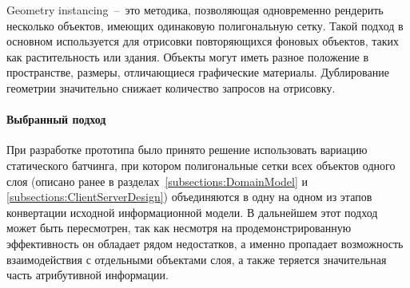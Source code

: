 \begin{enumerate}
{        Geometry instancing~--~это методика, позволяющая
        одновременно рендерить нес\-колько объектов, имеющих
        одинаковую полигональную сетку.
        Такой подход в основном используется для отрисовки
        повторяющихся фоновых объектов, таких как растительность или здания.
        Объекты могут иметь разное положение в пространстве,
        размеры, отличающиеся графические материалы.
        Дублирование геометрии значительно снижает
        количество запросов на отрисовку.
    }
\end{enumerate}

\paragraph{Выбранный подход}

При разработке прототипа было принято решение
использовать вариацию статического батчинга,
при котором полигональные сетки всех объектов одного слоя
(описано ранее в разделах~\ref{subsections:DomainModel}
и \ref{subsections:ClientServerDesign})
объединяются в одну на одном из этапов конвертации
исходной информационной модели.
В дальнейшем этот подход может быть пересмотрен,
так как несмотря на продемонстрированную эффективность
он обладает рядом недостатков,
а именно пропадает возможность взаимодействия с
отдельными объектами слоя, а также
теряется значительная часть атрибутивной информации.
